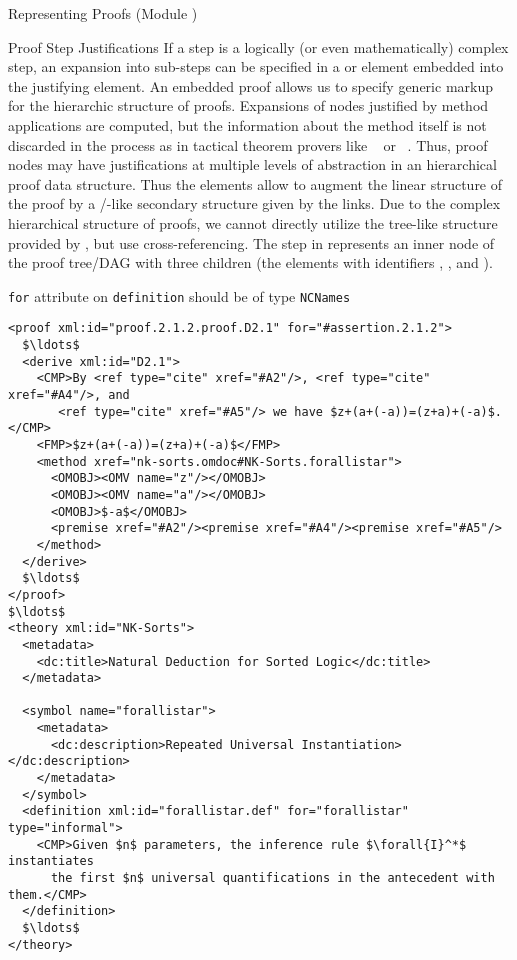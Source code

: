 \begin{tchapter}[id=proofs,short=Representing Proofs]{Representing Proofs (Module {})}
\begin{tsection}[id=proofs:justifications]{Proof Step Justifications}
  If a {} step is a logically (or even mathematically) complex step, an
  expansion into sub-steps can be specified in a {} or
  {} element embedded into the justifying {} element.
  An embedded proof allows us to specify generic markup for the hierarchic structure of
  proofs. Expansions of nodes justified by method applications are computed, but the
  information about the method itself is not discarded in the process as in tactical
  theorem provers like {\isabelle}~\cite{Paulson:iagtp94} or {\nuprl}~\cite{Constable86}.
  Thus, proof nodes may have justifications at multiple levels of abstraction in an
  hierarchical proof data structure.  Thus the {} elements allow to
  augment the linear structure of the proof by a {}/{}-like
  secondary structure given by the {} links. Due to the complex
  hierarchical structure of proofs, we cannot directly utilize the tree-like structure
  provided by {\xml}, but use cross-referencing.  The
  {} step in {} represents an inner node of the proof
  tree/DAG with three children (the elements with identifiers {},
  {}, and {}).

\begin{erratum}[reported-by=Michael Kohlhase,date=2009-08-11]{{\texttt{for}} attribute on
    {\texttt{definition}} should be of type {\texttt{NCNames}}}
\begin{lstlisting}[label=lst:derive,mathescape,
  caption={A {\element{derive}} Proof Step},index={derive,method,premise}]
<proof xml:id="proof.2.1.2.proof.D2.1" for="#assertion.2.1.2">
  $\ldots$
  <derive xml:id="D2.1">
    <CMP>By <ref type="cite" xref="#A2"/>, <ref type="cite" xref="#A4"/>, and
       <ref type="cite" xref="#A5"/> we have $z+(a+(-a))=(z+a)+(-a)$.</CMP>
    <FMP>$z+(a+(-a))=(z+a)+(-a)$</FMP>
    <method xref="nk-sorts.omdoc#NK-Sorts.forallistar">
      <OMOBJ><OMV name="z"/></OMOBJ>
      <OMOBJ><OMV name="a"/></OMOBJ>
      <OMOBJ>$-a$</OMOBJ>
      <premise xref="#A2"/><premise xref="#A4"/><premise xref="#A5"/>
    </method>
  </derive>
  $\ldots$
</proof>
$\ldots$
<theory xml:id="NK-Sorts">
  <metadata>
    <dc:title>Natural Deduction for Sorted Logic</dc:title>
  </metadata>
  
  <symbol name="forallistar">
    <metadata>
      <dc:description>Repeated Universal Instantiation></dc:description>
    </metadata>
  </symbol>
  <definition xml:id="forallistar.def" for="forallistar" type="informal">
    <CMP>Given $n$ parameters, the inference rule $\forall{I}^*$ instantiates 
      the first $n$ universal quantifications in the antecedent with them.</CMP>
  </definition>
  $\ldots$
</theory>
\end{lstlisting}
\end{erratum}


\end{tsection}
\end{tchapter}
